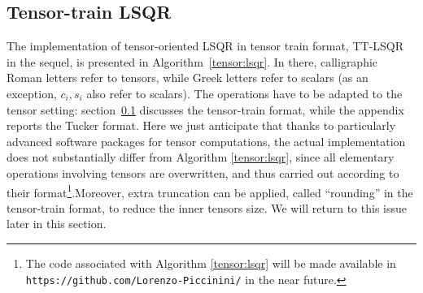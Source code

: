 \documentclass{siamart190516}
\begin{document}
\subsection{Tensor-train LSQR}\label{sec:ttlsqr}
The implementation of tensor-oriented LSQR in tensor train format, TT-LSQR in the sequel, is presented in Algorithm~\ref{tensor:lsqr}. In there, calligraphic Roman letters refer to tensors, while Greek letters refer to scalars (as an exception, $c_i, s_i$ also refer to scalars). The operations have to be adapted to the tensor setting:  section~\ref{sec:ttlsqr} discusses the tensor-train format, while the appendix reports the Tucker format. Here we just anticipate that thanks to 
particularly advanced software packages for tensor computations, the actual implementation does not substantially differ from 
Algorithm \ref{tensor:lsqr}, since all elementary operations 
involving tensors are overwritten, and thus
carried out according to their 
format\footnote{The code associated with Algorithm \ref{tensor:lsqr} will be made available in \\
{\tt https://github.com/Lorenzo-Piccinini/}
in the near future.}.Moreover, extra truncation can be applied, called ``rounding'' in the tensor-train format, to reduce the inner tensors size. We will
return to this issue later in this section.
\end{document}
